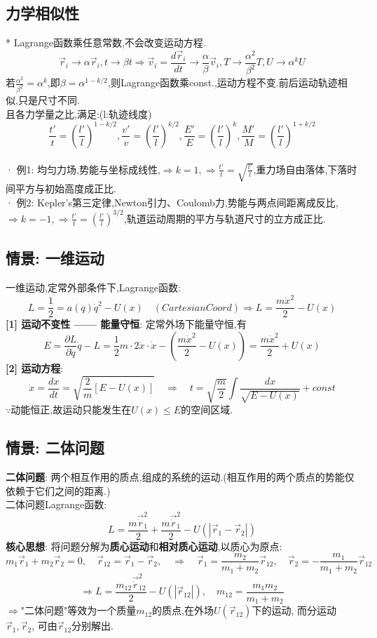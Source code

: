 \documentclass{article}
\begin{document}
\subsection{力学相似性}
* Lagrange函数乘任意常数,不会改变运动方程.
$$\vec r_i \to \alpha \vec r_i, t \to \beta t 
\Rightarrow \vec v_i = \frac{d\vec r_i}{dt} \to \frac{\alpha}{\beta}\vec v_i,T \to \frac{\alpha^2}{\beta^2}T,U \to  \alpha^k U$$
若$\frac{\alpha^2}{\beta^2} = \alpha ^ k $,即$\beta = \alpha^{1-k/2}$,则Lagrange函数乘const.,运动方程不变.前后运动轨迹相似,只是尺寸不同.\\
且各力学量之比,满足:\quad(l:轨迹线度)
$$\frac{t'}{t} = (\frac{l'}{l})^{1-k/2},\frac{v'}{v} = (\frac{l'}{l})^{k/2},\frac{E'}{E} = (\frac{l'}{l})^k,\frac{M'}{M} = (\frac{l'}{l})^{1+k/2}$$\\
· 例1: 均匀力场,势能与坐标成线性,$\Rightarrow k=1,\Rightarrow \frac{t'}{t} = \sqrt{\frac{l'}{l}}$,重力场自由落体,下落时间平方与初始高度成正比.\\
· 例2: Kepler's第三定律,Newton引力、Coulomb力,势能与两点间距离成反比,$\Rightarrow k=-1,\Rightarrow \frac{t'}{t} = (\frac{l'}{l})^{3/2}$,轨道运动周期的平方与轨道尺寸的立方成正比.


\subsection{情景: 一维运动}
一维运动,定常外部条件下,Lagrange函数:
$$L = \frac{1}{2} = a(q) \dot q^2 - U(x)\quad (CartesianCoord)\Rightarrow L = \frac{m \dot x^2}{2} - U(x)$$
\textbf{[1] 运动不变性 —— 能量守恒}: 定常外场下能量守恒,有
$$E = \frac{\partial L}{\partial \dot q}\dot q - L = \frac{1}{2}m\cdot 2 \dot x \cdot \dot x - (\frac{m \dot x^2}{2} - U(x)) = \frac{m \dot x^2}{2} + U(x) $$
\textbf{[2] 运动方程}:
$$\dot x = \frac{dx}{dt} = \sqrt{\frac{2}{m}[E - U(x)]}\quad \Rightarrow \quad t = \sqrt{\frac{m}{2}} \int \frac{dx}{\sqrt{E - U(x)}} + const$$
$\because$动能恒正,故运动只能发生在$U(x) \leqslant E$的空间区域.


\subsection{情景: 二体问题}
\textbf{二体问题}: 两个相互作用的质点,组成的系统的运动.(相互作用的两个质点的势能仅依赖于它们之间的距离.)\\
二体问题Lagrange函数:
$$L = \frac{m \vec \dot r_1^2}{2} + \frac{m \vec \dot r_1^2}{2} - U(|\vec r_1 - \vec r_2|)$$
\textbf{核心思想}: 将问题分解为\textbf{质心运动}和\textbf{相对质心运动},以质心为原点:
$$m_1\vec r_1 + m_2 \vec r_2 =0,\quad \vec r_{12} = \vec r_1 - \vec r_2, \quad \Rightarrow \quad \vec r_1 = \frac{m_2}{m_1 + m_2}\vec r_{12}, \quad \vec r_2 = - \frac{m_1}{m_1 + m_2}\vec r_{12} $$
$$\Rightarrow L = \frac{m_{12} \vec \dot r_{12}^2}{2} - U(|\vec r_{12}|), \quad m_{12} = \frac{m_1 m_2}{m_1 + m_2}$$
$\Rightarrow$"二体问题"等效为一个质量$m_{12}$的质点,在外场$U(\vec r_{12})$下的运动, 而分运动$\vec r_1, \vec r_2$, 可由$\vec r_{12}$分别解出.
\end{document}
